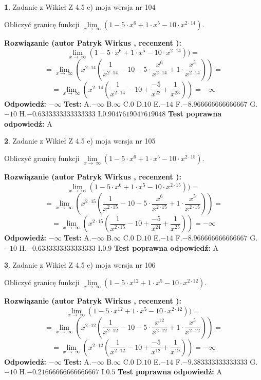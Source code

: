 \documentclass[12pt, a4paper]{article}
\theoremstyle{definition} %
\newtheorem{zad}{}
\newcommand{\zadStart}[1]{\begin{zad}#1\newline}
\newcommand{\zadStop}{\end{zad}}
\newcommand{\rozwStart}[2]{\noindent \textbf{Rozwiązanie (autor #1 , recenzent #2): }\newline}
\newcommand{\rozwStop}{\newline}
\newcommand{\odpStart}{\noindent \textbf{Odpowiedź:}\newline}
\newcommand{\odpStop}{\newline}
\newcommand{\testStart}{\noindent \textbf{Test:}\newline}
\newcommand{\testStop}{\newline}
\newcommand{\kluczStart}{\noindent \textbf{Test poprawna odpowiedź:}\newline}
\newcommand{\kluczStop}{\newline}
\begin{document}
\zadStart{Zadanie z Wikieł Z 4.5 e) moja wersja nr 104}


Obliczyć granicę funkcji  $\lim\limits_{x\to\ \infty}(1 - 5 \cdot x^{6}+1 \cdot x^{5}- 10 \cdot x^{2\cdot14})$.
\zadStop
\rozwStart{Patryk Wirkus}{}
$$\lim\limits_{x\to\ \infty}(1 - 5 \cdot x^{6}+1 \cdot x^{5}- 10 \cdot x^{2\cdot14}))=$$
$$=\lim\limits_{x\to\ \infty}(x^{2\cdot14}(\frac{1}{x^{2\cdot14}}-10 -5 \cdot \frac{x^{6}}{x^{2\cdot14}}+1 \cdot \frac{x^{5}}{x^{2\cdot14}}))=$$
$$=\lim\limits_{x\to\ \infty}(x^{2\cdot14}(\frac{1}{x^{2\cdot14}}-10 + \frac{-5}{x^{22}}+ \frac{1}{x^{23}}))=-\infty$$
\rozwStop
\odpStart
$-\infty$
\odpStop
\testStart
A.$-\infty$ B.$\infty$ C.$0$ D.$10$ E.$-14$
F.$-8.966666666666667$ G.$-10$
H.$-0.6333333333333333$
I.$0.9047619047619048$
\testStop
\kluczStart
A
\kluczStop



\zadStart{Zadanie z Wikieł Z 4.5 e) moja wersja nr 105}


Obliczyć granicę funkcji  $\lim\limits_{x\to\ \infty}(1 - 5 \cdot x^{6}+1 \cdot x^{5}- 10 \cdot x^{2\cdot15})$.
\zadStop
\rozwStart{Patryk Wirkus}{}
$$\lim\limits_{x\to\ \infty}(1 - 5 \cdot x^{6}+1 \cdot x^{5}- 10 \cdot x^{2\cdot15}))=$$
$$=\lim\limits_{x\to\ \infty}(x^{2\cdot15}(\frac{1}{x^{2\cdot15}}-10 -5 \cdot \frac{x^{6}}{x^{2\cdot15}}+1 \cdot \frac{x^{5}}{x^{2\cdot15}}))=$$
$$=\lim\limits_{x\to\ \infty}(x^{2\cdot15}(\frac{1}{x^{2\cdot15}}-10 + \frac{-5}{x^{24}}+ \frac{1}{x^{25}}))=-\infty$$
\rozwStop
\odpStart
$-\infty$
\odpStop
\testStart
A.$-\infty$ B.$\infty$ C.$0$ D.$10$ E.$-14$
F.$-8.966666666666667$ G.$-10$
H.$-0.6333333333333333$
I.$0.9$
\testStop
\kluczStart
A
\kluczStop



\zadStart{Zadanie z Wikieł Z 4.5 e) moja wersja nr 106}


Obliczyć granicę funkcji  $\lim\limits_{x\to\ \infty}(1 - 5 \cdot x^{12}+1 \cdot x^{5}- 10 \cdot x^{2\cdot12})$.
\zadStop
\rozwStart{Patryk Wirkus}{}
$$\lim\limits_{x\to\ \infty}(1 - 5 \cdot x^{12}+1 \cdot x^{5}- 10 \cdot x^{2\cdot12}))=$$
$$=\lim\limits_{x\to\ \infty}(x^{2\cdot12}(\frac{1}{x^{2\cdot12}}-10 -5 \cdot \frac{x^{12}}{x^{2\cdot12}}+1 \cdot \frac{x^{5}}{x^{2\cdot12}}))=$$
$$=\lim\limits_{x\to\ \infty}(x^{2\cdot12}(\frac{1}{x^{2\cdot12}}-10 + \frac{-5}{x^{12}}+ \frac{1}{x^{19}}))=-\infty$$
\rozwStop
\odpStart
$-\infty$
\odpStop
\testStart
A.$-\infty$ B.$\infty$ C.$0$ D.$10$ E.$-14$
F.$-9.383333333333333$ G.$-10$
H.$-0.21666666666666667$
I.$0.5$
\testStop
\kluczStart
A
\kluczStop
\end{document}
